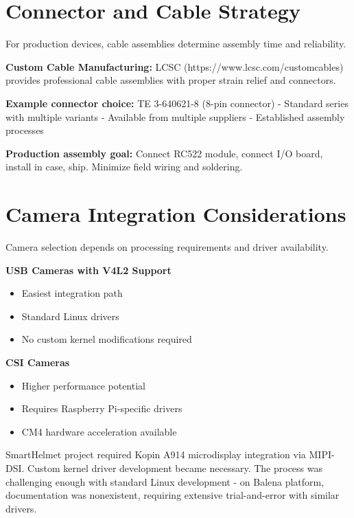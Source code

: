 \section{Connector and Cable Strategy}

For production devices, cable assemblies determine assembly time and reliability.

\textbf{Custom Cable Manufacturing:} LCSC (https://www.lcsc.com/customcables) provides professional cable assemblies with proper strain relief and connectors.

\textbf{Example connector choice:} TE 3-640621-8 (8-pin connector)
- Standard series with multiple variants
- Available from multiple suppliers
- Established assembly processes

\textbf{Production assembly goal:} Connect RC522 module, connect I/O board, install in case, ship. Minimize field wiring and soldering.

\section{Camera Integration Considerations}

Camera selection depends on processing requirements and driver availability.

\textbf{USB Cameras with V4L2 Support}
\begin{itemize}
\item Easiest integration path
\item Standard Linux drivers
\item No custom kernel modifications required
\end{itemize}

\textbf{CSI Cameras}
\begin{itemize}
\item Higher performance potential
\item Requires Raspberry Pi-specific drivers
\item CM4 hardware acceleration available
\end{itemize}

\begin{tcolorbox}[colback=yellow!10,colframe=orange!75!black,title=Real Example: Kopin A914 Integration]
SmartHelmet project required Kopin A914 microdisplay integration via MIPI-DSI. Custom kernel driver development became necessary. The process was challenging enough with standard Linux development - on Balena platform, documentation was nonexistent, requiring extensive trial-and-error with similar drivers.
\end{tcolorbox}


